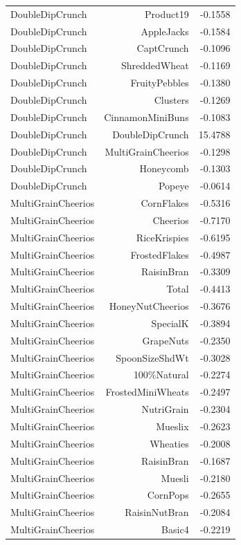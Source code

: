 \begin{longtable}{@{}lrr@{}}
DoubleDipCrunch & Product19 & -0.1558 \\
DoubleDipCrunch & AppleJacks & -0.1584 \\
DoubleDipCrunch & CaptCrunch & -0.1096 \\
DoubleDipCrunch & ShreddedWheat & -0.1169 \\
DoubleDipCrunch & FruityPebbles & -0.1380 \\
DoubleDipCrunch & Clusters & -0.1269 \\
DoubleDipCrunch & CinnamonMiniBuns & -0.1083 \\
DoubleDipCrunch & DoubleDipCrunch & 15.4788 \\
DoubleDipCrunch & MultiGrainCheerios & -0.1298 \\
DoubleDipCrunch & Honeycomb & -0.1303 \\
DoubleDipCrunch & Popeye & -0.0614 \\
MultiGrainCheerios & CornFlakes & -0.5316 \\
MultiGrainCheerios & Cheerios & -0.7170 \\
MultiGrainCheerios & RiceKrispies & -0.6195 \\
MultiGrainCheerios & FrostedFlakes & -0.4987 \\
MultiGrainCheerios & RaisinBran & -0.3309 \\
MultiGrainCheerios & Total & -0.4413 \\
MultiGrainCheerios & HoneyNutCheerios & -0.3676 \\
MultiGrainCheerios & SpecialK & -0.3894 \\
MultiGrainCheerios & GrapeNuts & -0.2350 \\
MultiGrainCheerios & SpoonSizeShdWt & -0.3028 \\
MultiGrainCheerios & 100\%Natural & -0.2274 \\
MultiGrainCheerios & FrostedMiniWheats & -0.2497 \\
MultiGrainCheerios & NutriGrain & -0.2304 \\
MultiGrainCheerios & Mueslix & -0.2623 \\
MultiGrainCheerios & Wheaties & -0.2008 \\
MultiGrainCheerios & RaisinBran & -0.1687 \\
MultiGrainCheerios & Muesli & -0.2180 \\
MultiGrainCheerios & CornPops & -0.2655 \\
MultiGrainCheerios & RaisinNutBran & -0.2084 \\
MultiGrainCheerios & Basic4 & -0.2219 \\

\end{longtable}
